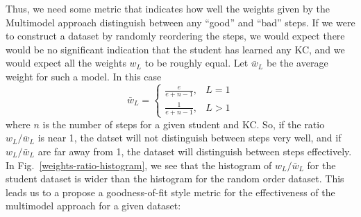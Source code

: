 \documentclass[11pt,letterpaper]{article}
\begin{document}
Thus, we need some metric that indicates how well the 
weights given by the Multimodel approach distinguish between
any ``good'' and ``bad'' steps.  If we were to construct
a dataset by randomly reordering the steps, we would expect
there would be no significant indication that the student has learned
any KC, and we would expect all the weights $w_L$ to be
roughly equal.  Let $\bar{w}_L$ be the average weight for
such a model.  In this case
\begin{equation}
  \bar{w}_L = \left\{ \begin{array}{cc} \frac{e}{e+n-1}, & L=1 \\
                                        \frac{1}{e+n-1}, & L>1
                     \end{array} \right.
\end{equation}
%
where $n$ is the number of steps for a given student and KC.
So, if the ratio $w_L/\bar{w}_L$ is near 1, the datset will
not distinguish between steps very well, and if $w_L/\bar{w}_L$
are far away from 1, the dataset will distinguish between steps
effectively.  In Fig.~\ref{weights-ratio-histogram}, we see
that the histogram of $w_L/\bar{w}_L$ for the student
dataset is wider than the histogram for the
random order dataset.  This leads us to a propose
a goodness-of-fit style metric for the effectiveness of the
multimodel approach for a given dataset:
%
\end{document}
